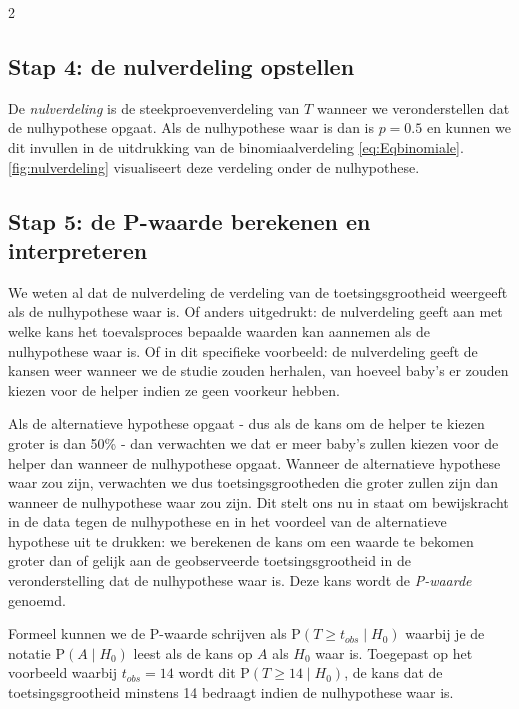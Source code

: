 \begin{multicols}{2}
\subsection*{Stap 4: de nulverdeling opstellen}

De \emph{nulverdeling} is  de steekproevenverdeling van \(T\) wanneer we veronderstellen dat de nulhypothese opgaat. Als de nulhypothese waar is dan is \(p =0.5\) en kunnen we dit invullen in de uitdrukking van de binomiaalverdeling \eqref{eq:Eqbinomiale}. \autoref{fig:nulverdeling} visualiseert deze verdeling onder de nulhypothese. 




\subsection*{Stap 5: de P-waarde berekenen en interpreteren}

We weten al dat de nulverdeling de verdeling van de toetsingsgrootheid weergeeft als de nulhypothese waar is. Of anders uitgedrukt: de nulverdeling geeft aan met welke kans het toevalsproces bepaalde waarden kan aannemen als de nulhypothese waar is. Of in dit specifieke voorbeeld: de nulverdeling geeft de kansen weer wanneer we de studie zouden herhalen, van hoeveel baby's er zouden kiezen voor de helper indien ze geen voorkeur hebben.

Als de alternatieve hypothese opgaat - dus als de kans om de helper te kiezen groter is dan 50\% - dan verwachten we dat er meer baby's zullen kiezen voor de helper dan wanneer de nulhypothese opgaat. Wanneer de alternatieve hypothese waar zou zijn, verwachten we dus toetsingsgrootheden die groter zullen zijn dan wanneer de nulhypothese waar zou zijn. Dit stelt ons nu in staat om bewijskracht in de data tegen de nulhypothese en in het voordeel van de alternatieve hypothese uit te drukken: we berekenen de kans om een waarde te bekomen groter dan of gelijk aan de geobserveerde toetsingsgrootheid in de veronderstelling dat de nulhypothese waar is. Deze kans wordt de \emph{P-waarde} genoemd. 

Formeel kunnen we de P-waarde schrijven als \(\textrm{P}(T \geq t_{obs} \mid H_0)\) waarbij je de notatie \(\textrm{P}(A \mid H_0)\) leest als de kans op \(A\) als \(H_0\) waar is. Toegepast op het voorbeeld waarbij \(t_{obs} = 14\) wordt dit \(\textrm{P}(T \geq 14 \mid H_0)\), de kans dat de toetsingsgrootheid minstens 14 bedraagt indien de nulhypothese waar is.


\end{multicols}
